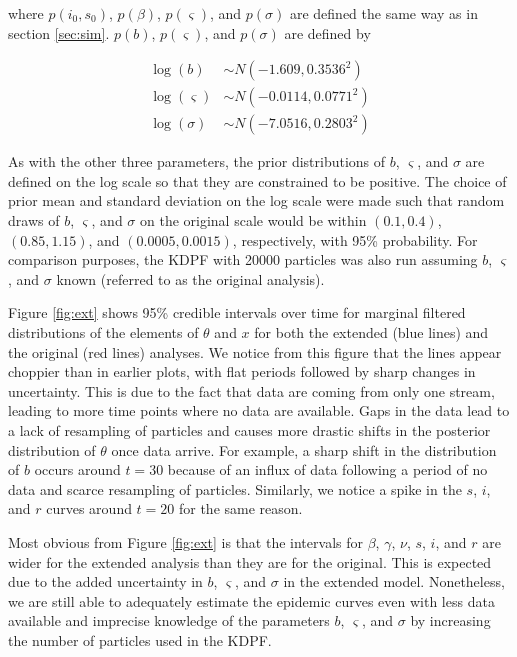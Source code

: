 \documentclass{elsarticle}
\begin{document}
\noindent where $p(i_0,s_0)$, $p(\beta)$, $p(\varsigma)$, and $p(\sigma)$ are defined the same way as in section \ref{sec:sim}.  $p(b)$, $p(\varsigma)$, and $p(\sigma)$ are defined by

\begin{align*}
\log(b) &\sim  N(-1.609, 0.3536^2) \\
\log(\varsigma) &\sim N(-0.0114, 0.0771^2) \\
\log(\sigma) &\sim N(-7.0516, 0.2803^2)
\end{align*}

As with the other three parameters, the prior distributions of $b$, $\varsigma$, and $\sigma$ are defined on the log scale so that they are constrained to be positive.  The choice of prior mean and standard deviation on the log scale were made such that random draws of $b$, $\varsigma$, and $\sigma$ on the original scale would be within $(0.1, 0.4)$, $(0.85, 1.15)$, and $(0.0005, 0.0015)$, respectively, with 95\% probability.  For comparison purposes, the KDPF with 20000 particles was also run assuming $b$, $\varsigma$, and $\sigma$ known (referred to as the original analysis).

Figure \ref{fig:ext} shows 95\% credible intervals over time for marginal filtered distributions of the elements of $\theta$ and $x$ for both the extended (blue lines) and the original (red lines) analyses.  We notice from this figure that the lines appear choppier than in earlier plots, with flat periods followed by sharp changes in uncertainty.  This is due to the fact that data are coming from only one stream, leading to more time points where no data are available.  Gaps in the data lead to a lack of resampling of particles and causes more drastic shifts in the posterior distribution of $\theta$ once data arrive.  For example, a sharp shift in the distribution of $b$ occurs around $t = 30$ because of an influx of data following a period of no data and scarce resampling of particles.  Similarly, we notice a spike in the $s$, $i$, and $r$ curves around $t = 20$ for the same reason.

Most obvious from Figure \ref{fig:ext} is that the intervals for $\beta$, $\gamma$, $\nu$, $s$, $i$, and $r$ are wider for the extended analysis than they are for the original.  This is expected due to the added uncertainty in $b$, $\varsigma$, and $\sigma$ in the extended model.  Nonetheless, we are still able to adequately estimate the epidemic curves even with less data available and imprecise knowledge of the parameters $b$, $\varsigma$, and $\sigma$ by increasing the number of particles used in the KDPF.
\end{document}
